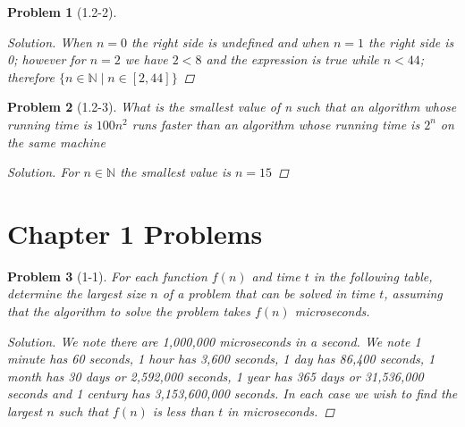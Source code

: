 \documentclass[oneside]{book}
\newtheorem{problem}{Problem}
\begin{document}
\begin{spacing}{1.618}
\begin{problem}[1.2-2]
\begin{proof}[Solution]
		When $n=0$ the right side is undefined and when $n=1$ the right side is 0; however for $n=2$ we have $2<8$ and the expression is true while $n<44$; therefore $\{n\in\mathbb{N}\mid n\in[2, 44]\}$
	\end{proof}
\end{problem}

\begin{problem}[1.2-3]
	What is the smallest value of n such that an algorithm whose running time is $100n^2$ runs faster than an algorithm whose running time is $2^n$ on the same machine
	\begin{proof}[Solution]
		For $n\in \mathbb{N}$ the smallest value is $n=15$
	\end{proof}	
\end{problem}

\section{Chapter 1 Problems}

\begin{problem}[1-1]
	For each function $f(n)$ and time $t$ in the following table, determine the largest size $n$ of a problem that can be solved in time $t$, assuming that the algorithm to solve the problem takes $f(n)$ microseconds. 
	\begin{proof}[Solution]
		We note there are 1,000,000 microseconds in a second. We note 1 minute has 60 seconds, 1 hour has 3,600 seconds, 1 day has 86,400 seconds, 1 month has 30 days or 2,592,000 seconds, 1 year has 365 days or 31,536,000 seconds and 1 century has   3,153,600,000 seconds. In each case we wish to find the largest $n$ such that $f(n)$ is less than $t$ in microseconds. 
		

\end{proof}
\end{problem}
\end{spacing}
\end{document}
